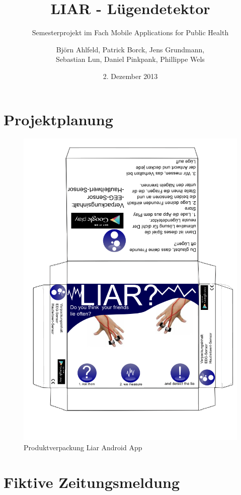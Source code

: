 \documentclass[10pt, a4paper, oneside, titlepage]{scrartcl} %
\date{2. Dezember 2013}
\author{Björn Ahlfeld, Patrick Borck, Jens Grundmann,\\ Sebastian Lun, Daniel Pinkpank, Phillippe Wels}
\title{LIAR - Lügendetektor}
\subtitle{Semesterprojekt im Fach Mobile Applications for Public Health}
\begin{document}
   	\maketitle
   	\thispagestyle{empty}
	\tableofcontents
	\listoffigures
	\listoftables
   	\newpage
   	\section{Projektplanung}  
   \begin{figure}[ht!]
	\begin{center}
		\includegraphics[scale=0.5]{verpackung_bjoern.png}
	\end{center}
	\caption[Produktverpackung]{Produktverpackung Liar Android App}
	\label{fig:verpackung}
	\end{figure}

	\newpage
	\section{Fiktive Zeitungsmeldung}
		
\end{document}
